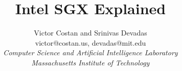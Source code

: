 \documentclass[11pt,twocolumn]{article}
\begin{document}
\newcommand{\HeadingLevelA}[1]{\section{#1}}
\newcommand{\HeadingLevelB}[1]{\subsection{#1}}
\newcommand{\HeadingLevelC}[1]{\subsubsection{#1}}

\title{Intel SGX Explained}
\author{Victor Costan and Srinivas Devadas \\
        victor@costan.us, devadas@mit.edu \\
        \em Computer Science and Artificial Intelligence Laboratory \\
        \em Massachusetts Institute of Technology}
\date{}

\maketitle











\setlength{\bibsep}{1pt}
\small

%
%

\end{document}
